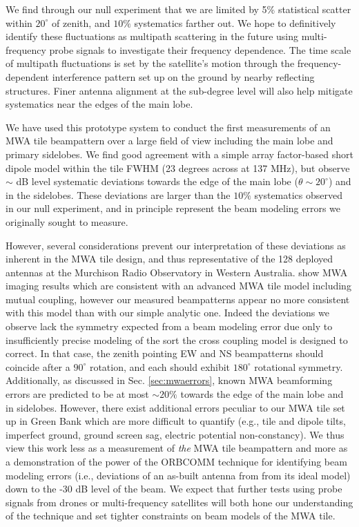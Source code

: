 We find through our null experiment that we are limited by 5\% statistical scatter within $20^\circ$ of zenith, and $10\%$ systematics farther out. We hope to definitively identify these fluctuations as multipath scattering in the future using multi-frequency probe signals to investigate their frequency dependence. The time scale of multipath fluctuations is set by the satellite's motion through the frequency-dependent interference pattern set up on the ground by nearby reflecting structures. Finer antenna alignment at the sub-degree level will also help mitigate systematics near the edges of the main lobe. 

We have used this prototype system to conduct the first measurements of an MWA tile beampattern over a large field of view including the main lobe and primary sidelobes. We find good agreement with a simple array factor-based short dipole model within the tile FWHM (23 degrees across at 137 MHz), but observe $\sim$ dB level systematic deviations towards the edge of the main lobe ($\theta\sim20^\circ$) and in the sidelobes. These deviations are larger than the $10\%$ systematics observed in our null experiment, and in principle represent the beam modeling errors we originally sought to measure. 

However, several considerations prevent our interpretation of these deviations as inherent in the MWA tile design, and thus representative of the 128 deployed antennas at the Murchison Radio Observatory in Western Australia. \citet{sutinjo2015} show MWA imaging results which are consistent with an advanced MWA tile model including mutual coupling, however our measured beampatterns appear no more consistent with this model than with our simple analytic one. Indeed the deviations we observe lack the symmetry expected from a beam modeling error due only to insufficiently precise modeling of the sort the cross coupling model is designed to correct. In that case, the zenith pointing EW and NS beampatterns should coincide after a $90^\circ$ rotation, and each should exhibit $180^\circ$ rotational symmetry. Additionally, as discussed in Sec. \ref{sec:mwaerrors}, known MWA beamforming errors are predicted to be at most $\sim20\%$ towards the edge of the main lobe and in sidelobes. However, there exist additional errors peculiar to our MWA tile set up in Green Bank which are more difficult to quantify (e.g., tile and dipole tilts, imperfect ground, ground screen sag, electric potential non-constancy). We thus view this work less as a measurement of \textit{the} MWA tile beampattern and more as a demonstration of the power of the ORBCOMM technique for identifying beam modeling errors (i.e., deviations of an as-built antenna from from its ideal model) down to the -30 dB level of the beam. We expect that further tests using probe signals from drones or multi-frequency satellites will both hone our understanding of the technique and set tighter constraints on beam models of the MWA tile.

